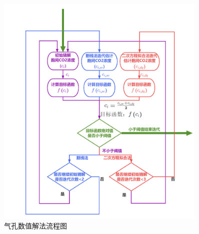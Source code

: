 {
\begin{figure}[htbp]
\centering
\includegraphics[width=0.9\textwidth]{Figures/气孔导度和光合作用/气孔数值解法流程图.png}
\caption{气孔数值解法流程图}
\label{fig:气孔数值解法流程图}
\end{figure}
}
